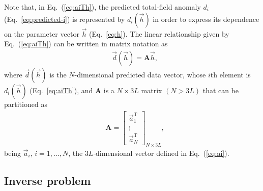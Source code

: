 \documentclass[journal abbreviation, npg]{copernicus}
\begin{document}
Note that, in Eq.~(\ref{eq:aiTh}), the predicted total-field anomaly $d_{i}$
(Eq.~\ref{eq:predicted-i}) is represented by $d_{i}(\vec{h})$ in order to
express its dependence on the parameter vector $\vec{h}$ (Eq.~\ref{eq:h}).
The linear relationship given by Eq.~(\ref{eq:aiTh}) can be written in matrix
notation as
\begin{align}
 &
\vec{d}(\vec{h}) = \mathbf{A}  \vec{h} ,
\label{eq:predicted-data-vector}
\end{align}
where $\vec{d}(\vec{h})$ is the $N$-dimensional predicted data vector, whose
$i$th element is $d_{i}(\vec{h})$ (Eq.~\ref{eq:aiTh}), and $\mathbf{A}$ is
a $N \times 3L$ matrix $\left(N > 3L\right)$ that can be partitioned as
\begin{align}
 &
\mathbf{A} =
\left[
\begin{array}{c}
\vec{a}_{1}^{\mathrm{T}} \\
\vdots \\
\vec{a}_{N}^{\mathrm{T}}
\end{array}
\right]_{N \times 3L} ,
\label{eq:sensibility-matrix}
\end{align}
being $\vec{a}_{i}$, $i = 1, \ldots, N$, the $3L$-dimensional vector
defined in Eq.~(\ref{eq:ai}).

\subsection{Inverse problem}
\end{document}
